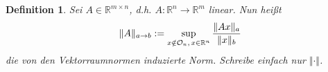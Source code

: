\documentclass[12pt]{article}
\theoremstyle{break}
\newtheorem{definition}[theorem]{Definition}
\newtheorem{comment}[theorem]{Bemerkung}
\begin{document}
\begin{definition}
Sei $A\in \mathbb{R}^{m \times n}$, d.h. $A: \mathbb{R}^n \rightarrow \mathbb{R}^m$ linear. Nun heißt
$$\Vert A \Vert_{a \rightarrow b} := \sup_{x \notin \mathcal{O}_n, \thinspace x \in \mathbb{R}^n} \frac{\Vert Ax \Vert_a}{\Vert x\Vert_b}$$
die von den Vektorraumnormen induzierte Norm. Schreibe einfach nur $\Vert \cdot \Vert$.
\end{definition}

\end{document}
